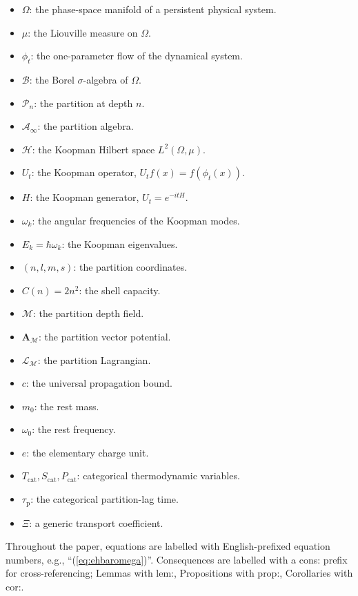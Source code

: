 \documentclass[11pt,twocolumn,a4paper]{article}
\theoremstyle{axiomstyle}
\theoremstyle{conseqstyle}
\theoremstyle{definition}
\theoremstyle{remark}
\newcommand{\Depth}{\mathcal{M}}
\newcommand{\Partition}{\mathcal{P}}
\newcommand{\Hilbert}{\mathcal{H}}
\newcommand{\taup}{\tau_{\mathrm{p}}}
\newcommand{\Apartition}{\bm{A}_{\Depth}}
\newcommand{\Lagr}{\mathcal{L}}
\begin{document}
\begin{itemize}
\item $\Omega$: the phase-space manifold of a persistent physical system.
\item $\mu$: the Liouville measure on $\Omega$.
\item $\phi_{t}$: the one-parameter flow of the dynamical system.
\item $\mathcal{B}$: the Borel $\sigma$-algebra of $\Omega$.
\item $\Partition_{n}$: the partition at depth $n$.
\item $\mathcal{A}_{\infty}$: the partition algebra.
\item $\Hilbert$: the Koopman Hilbert space $L^{2}(\Omega,\mu)$.
\item $U_{t}$: the Koopman operator, $U_{t}f(x)=f(\phi_{t}(x))$.
\item $H$: the Koopman generator, $U_{t}=e^{-itH}$.
\item $\omega_{k}$: the angular frequencies of the Koopman modes.
\item $E_{k}=\hbar\omega_{k}$: the Koopman eigenvalues.
\item $(n,l,m,s)$: the partition coordinates.
\item $C(n)=2n^{2}$: the shell capacity.
\item $\Depth$: the partition depth field.
\item $\Apartition$: the partition vector potential.
\item $\Lagr_{\Depth}$: the partition Lagrangian.
\item $c$: the universal propagation bound.
\item $m_{0}$: the rest mass.
\item $\omega_{0}$: the rest frequency.
\item $e$: the elementary charge unit.
\item $T_{\text{cat}}, S_{\text{cat}}, P_{\text{cat}}$: categorical thermodynamic variables.
\item $\taup$: the categorical partition-lag time.
\item $\Xi$: a generic transport coefficient.
\end{itemize}

Throughout the paper, equations are labelled with English-prefixed equation numbers, e.g., ``(\ref{eq:ehbaromega})''. Consequences are labelled with a cons: prefix for cross-referencing; Lemmas with lem:, Propositions with prop:, Corollaries with cor:.

\end{document}
